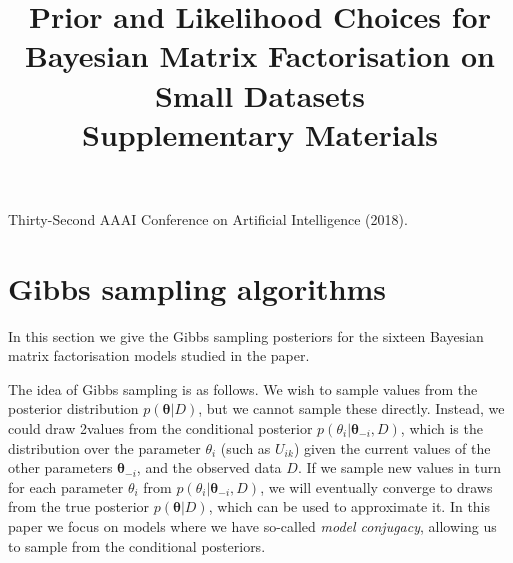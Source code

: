 \documentclass{article}
\newcommand{\btheta}{\boldsymbol \theta}
\begin{document}
	\title{Prior and Likelihood Choices for Bayesian Matrix Factorisation on Small Datasets \\ \vspace{10pt} Supplementary Materials}
	\author{}
	\date{}
	\maketitle{}
	
	\noindent \large{Thirty-Second AAAI Conference on Artificial Intelligence (2018).} \\
	
	\setcounter{secnumdepth}{3}
	\setcounter{tocdepth}{2}
	\tableofcontents
	\clearpage
		
		
	\section{Gibbs sampling algorithms}
		In this section we give the Gibbs sampling posteriors for the sixteen Bayesian matrix factorisation models studied in the paper. 
		
		The idea of Gibbs sampling is as follows. We wish to sample values from the posterior distribution $p(\btheta|D)$, but we cannot sample these directly. Instead, we could draw 2values from the conditional posterior $ p(\theta_i | \btheta_{-i}, D ) $, which is the distribution over the parameter $ \theta_i $ (such as $U_{ik}$) given the current values of the other parameters $ \btheta_{-i} $, and the observed data $ D $. If we sample new values in turn for each parameter $ \theta_i $ from $ p(\theta_i | \btheta_{-i}, D ) $, we will eventually converge to draws from the true posterior $ p(\btheta|D) $, which can be used to approximate it. 
		In this paper we focus on models where we have so-called \textit{model conjugacy}, allowing us to sample from the conditional posteriors.
		
\end{document}
